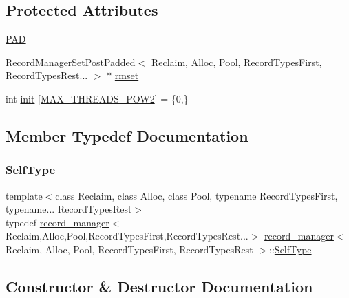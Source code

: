 \subsection*{Protected Attributes}
\begin{DoxyCompactItemize}
\item 
\hyperlink{classrecord__manager_aa7a4191bd0edf5034564e41b205bcc15}{P\+AD}
\item 
\hyperlink{classRecordManagerSetPostPadded}{Record\+Manager\+Set\+Post\+Padded}$<$ Reclaim, Alloc, Pool, Record\+Types\+First, Record\+Types\+Rest... $>$ $\ast$ \hyperlink{classrecord__manager_a24c980c71ad23298822a4a35a6433d63}{rmset}
\item 
int \hyperlink{classrecord__manager_a50fe8392a791e6f3b296a2e25b337149}{init} \mbox{[}\hyperlink{plaf_8h_ac1585a3455dd3e33e877e588be9e466b}{M\+A\+X\+\_\+\+T\+H\+R\+E\+A\+D\+S\+\_\+\+P\+O\+W2}\mbox{]} = \{0,\}
\end{DoxyCompactItemize}


\subsection{Member Typedef Documentation}
\mbox{\label{classrecord__manager_a294739c32aa84eb40b32090b45fdc137}} 
\subsubsection{\texorpdfstring{Self\+Type}{SelfType}}
{\footnotesize\ttfamily template$<$class Reclaim, class Alloc, class Pool, typename Record\+Types\+First, typename... Record\+Types\+Rest$>$ \\
typedef \hyperlink{classrecord__manager}{record\+\_\+manager}$<$Reclaim,Alloc,Pool,Record\+Types\+First,Record\+Types\+Rest...$>$ \hyperlink{classrecord__manager}{record\+\_\+manager}$<$ Reclaim, Alloc, Pool, Record\+Types\+First, Record\+Types\+Rest $>$\+::\hyperlink{classrecord__manager_a294739c32aa84eb40b32090b45fdc137}{Self\+Type}\hspace{0.3cm}{\ttfamily [protected]}}



\subsection{Constructor \& Destructor Documentation}
\mbox{\label{classrecord__manager_a6c504d455df4b4eb7569f633baac409d}} 
